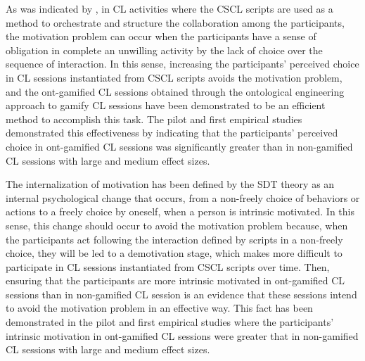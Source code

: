 As was indicated by , in CL activities where the CSCL scripts are used as a method to orchestrate and structure the collaboration among the participants, the motivation problem can occur when the participants have a sense of obligation in complete an unwilling activity by the lack of choice over the sequence of interaction. In this sense, increasing the participants' perceived choice in CL sessions instantiated from CSCL scripts avoids the motivation problem, and the ont-gamified CL sessions obtained through the ontological engineering approach to gamify CL sessions have been demonstrated to be an efficient method to accomplish this task. The pilot and first empirical studies demonstrated this effectiveness by indicating that the participants' perceived choice in ont-gamified CL sessions was significantly greater than in non-gamified CL sessions with large and medium effect sizes. 

The internalization of motivation has been defined by the SDT theory \cite{RyanDeci2000} as an internal psychological change that occurs, from a non-freely choice of behaviors or actions to a freely choice by oneself, when a person is intrinsic motivated. In this sense, this change should occur to avoid the motivation problem because, when the participants act following the interaction defined by scripts in a non-freely choice, they will be led to a demotivation stage, which makes more difficult to participate in CL sessions instantiated from CSCL scripts over time. Then, ensuring that the participants are more intrinsic motivated in ont-gamified CL sessions than in non-gamified CL session is an evidence that these sessions intend to avoid the motivation problem in an effective way. This fact has been demonstrated in the pilot and first empirical studies where the participants' intrinsic motivation in ont-gamified CL sessions were greater that in non-gamified CL sessions with large and medium effect sizes. 

